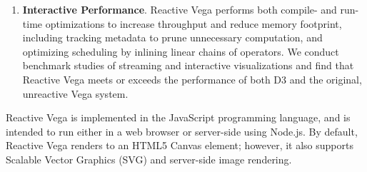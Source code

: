 \begin{enumerate}
  \item \textbf{Interactive Performance}. Reactive Vega performs both compile-
and run-time optimizations to increase throughput and reduce memory footprint,
including tracking metadata to prune unnecessary computation, and optimizing
scheduling by inlining linear chains of operators. We conduct benchmark
studies of streaming and interactive visualizations and find that Reactive
Vega meets or exceeds the performance of both D3 and the original, unreactive
Vega system.
\end{enumerate}

Reactive Vega is implemented in the JavaScript programming language, and is
intended to run either in a web browser or server-side using Node.js. By
default, Reactive Vega renders to an HTML5 Canvas element; however, it also
supports Scalable Vector Graphics (SVG) and server-side image rendering.



